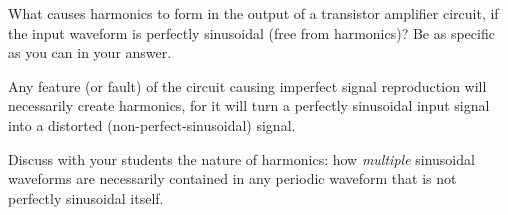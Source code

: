 

What causes harmonics to form in the output of a transistor amplifier circuit, if the input waveform is perfectly sinusoidal (free from harmonics)?  Be as specific as you can in your answer.







Any feature (or fault) of the circuit causing imperfect signal reproduction will necessarily create harmonics, for it will turn a perfectly sinusoidal input signal into a distorted (non-perfect-sinusoidal) signal.







Discuss with your students the nature of harmonics: how {\it multiple} sinusoidal waveforms are necessarily contained in any periodic waveform that is not perfectly sinusoidal itself.




